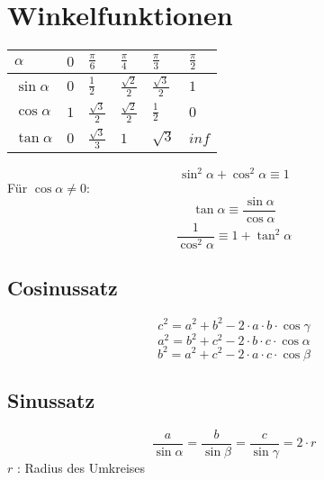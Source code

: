 %
%

\section{Winkelfunktionen}

\begin{center}\begin{tabular}{| p{1cm} | p{1cm} | p{1cm} | p{1cm} | p{1cm} | p{1cm} |}
\hline
$\alpha$ & $0$ & $\frac{\pi}{6}$ & $\frac{\pi}{4}$ & $\frac{\pi}{3}$ & $\frac{\pi}{2}$ \\
\hline
$\sin{\alpha}$ & $0$ & $\frac{1}{2}$ & $\frac{\sqrt{2}}{2}$ & $\frac{\sqrt{3}}{2}$ & $1$ \\
\hline
$\cos{\alpha}$ & $1$ & $\frac{\sqrt{3}}{2}$ & $\frac{\sqrt{2}}{2}$ & $\frac{1}{2}$ & $0$ \\
\hline
$\tan{\alpha}$ & $0$ & $\frac{\sqrt{3}}{3}$ & $1$ & $\sqrt{3}$ & $inf$ \\
\hline
\end{tabular}\end{center}

\begin{equation}
\sin^2{\alpha} + \cos^2{\alpha} \equiv 1
\end{equation}
F\"ur $\cos{\alpha} \neq 0$:
\begin{equation}
\tan{\alpha} \equiv \frac{\sin{\alpha}}{\cos{\alpha}}
\end{equation}
\begin{equation}
\frac{1}{\cos^2{\alpha}} \equiv 1 + \tan^2{\alpha}
\end{equation}

\subsection{Cosinussatz}
\begin{equation}
c^2 = a^2 + b^2 - 2 \cdot a \cdot b \cdot \cos{\gamma}
\end{equation}
\begin{equation}
a^2 = b^2 + c^2 - 2 \cdot b \cdot c \cdot \cos{\alpha}
\end{equation}
\begin{equation}
b^2 = a^2 + c^2 - 2 \cdot a \cdot c \cdot \cos{\beta}
\end{equation}

\subsection{Sinussatz}
\begin{equation}
\frac{a}{\sin{\alpha}} = \frac{b}{\sin{\beta}} = \frac{c}{\sin{\gamma}} = 2 \cdot r
\end{equation}
$r$ : Radius des Umkreises

